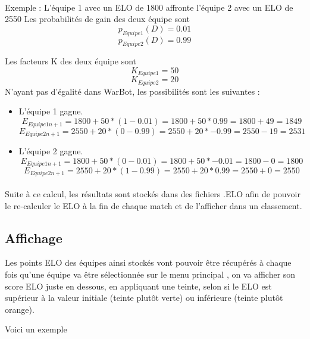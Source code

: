\documentclass{report}
\begin{document}
\paragraph{}
\newpage
Exemple : \newline
L'équipe 1 avec un ELO de 1800 affronte l'équipe 2 avec un ELO de 2550 \newline
Les probabilités de gain des deux équipe sont
\[
p_{Equipe 1}(D) = 0.01
\]
\[
p_{Equipe 2}(D) = 0.99
\]\newline

Les facteurs K des deux équipe sont 
\[
K_{Equipe 1} = 50
\]
\[
K_{Equipe 2} = 20
\]\newline
N'ayant pas d'égalité dans WarBot, les possibilités sont les suivantes :
\newline
\begin{itemize}
\item
L'équipe 1 gagne.
\[
E_{Equipe 1 n+1} = 1800 + 50 * (1 - 0.01) = 1800 + 50 *  0.99 = 1800 + 49 = 1849
\]
\[
E_{Equipe 2 n+1} = 2550 + 20 * (0 - 0.99) = 2550 + 20 * -0.99 = 2550 - 19 = 2531
\]
\newline
\item
L'équipe 2 gagne.
\[
E_{Equipe 1 n+1} = 1800 + 50 * (0 - 0.01) = 1800 + 50 * -0.01 = 1800 - 0 = 1800
\]
\[
E_{Equipe 2 n+1} = 2550 + 20 * (1 - 0.99) = 2550 + 20 *  0.99 = 2550 + 0 = 2550
\]
\end{itemize}
\paragraph{}
Suite à ce calcul, les résultats sont stockés dans des fichiers .ELO afin de pouvoir le re-calculer le ELO à la fin de chaque match et de l'afficher dans un classement.

\subsection{Affichage}
Les points ELO des équipes ainsi stockés vont pouvoir être récupérés à chaque fois qu’une équipe va être sélectionnée sur le menu principal , on va afficher son score ELO juste en dessous, en appliquant une teinte, selon si le ELO est supérieur à la valeur initiale (teinte plutôt verte) ou inférieure (teinte plutôt orange).

Voici un exemple 
\end{document}
